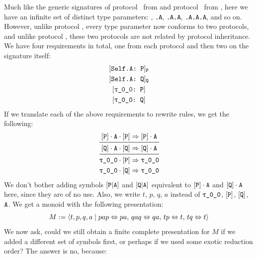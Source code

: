 \documentclass[../generics]{subfiles}
\begin{document}
Much like the generic signatures of protocol \tN\ from  and protocol \tO\ from , here we have an infinite set of distinct type parameters: \rT, \texttt{\rT.A}, \texttt{\rT.A.A}, \texttt{\rT.A.A.A}, and so on. However, unlike protocol \tN, every type parameter now conforms to two protocols, and unlike protocol \tO, these two protocols are not related by protocol inheritance. We have four requirements in total, one from each protocol and then two on the signature itself:
\begin{gather*}
\AssocConfReq{Self.A}{P}{P} \\
\AssocConfReq{Self.A}{Q}{Q} \\
\ConfReq{\rT}{P} \\
\ConfReq{\rT}{Q}
\end{gather*}
If we translate each of the above requirements to rewrite rules, we get the following:
\begin{gather*}
\ProtoConf{\pP \cdot \nA}{P} \\
\midrule
\ProtoConf{\pQ \cdot \nA}{Q} \\
\midrule
\ProtoConf{\rT}{P} \\
\ProtoConf{\rT}{Q}
\end{gather*}
We don't bother adding symbols $[\texttt{P}|\texttt{A}]$ and $[\texttt{Q}|\texttt{A}]$ equivalent to $[\texttt{P}] \cdot \texttt{A}$ and $[\texttt{Q}] \cdot \texttt{A}$ here, since they are of no use. Also, we write $t$, $p$, $q$, $a$ instead of $\rT$, $[\texttt{P}]$, $[\texttt{Q}]$, $\texttt{A}$. We get a monoid with the following presentation:
\[
M := \langle t,p,q,a \mid pap \Leftrightarrow pa,\, qaq \Leftrightarrow qa,\,tp \Leftrightarrow t,\,tq \Leftrightarrow t\rangle
\]
We now ask, could we still obtain a finite complete presentation for $M$ if we added a different set of symbols first, or perhaps if we used some exotic reduction order? The answer is no, because:
\end{document}
